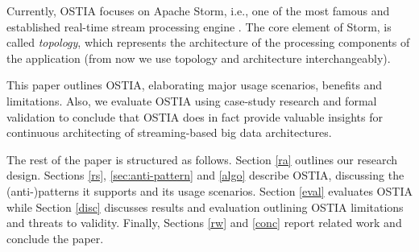 Currently, OSTIA focuses on Apache Storm, i.e., one of the most famous and established real-time stream processing engine \cite{storm, toshniwal2014storm}. The core element of Storm, is called \emph{topology}, which represents the architecture of the processing components of the application (from now we use topology and architecture interchangeably).

This paper outlines OSTIA, elaborating major usage scenarios, benefits and limitations. Also, we evaluate OSTIA using case-study research and formal validation to conclude that OSTIA does in fact provide valuable insights for continuous architecting of streaming-based big data architectures.

The rest of the paper is structured as follows. Section \ref{ra} outlines our research design. Sections \ref{rs}, \ref{sec:anti-pattern} and \ref{algo} describe OSTIA, discussing the (anti-)patterns it supports and its usage scenarios. Section \ref{eval} evaluates OSTIA while Section \ref{disc} discusses results and evaluation outlining OSTIA limitations and threats to validity. Finally, Sections \ref{rw} and \ref{conc} report related work and conclude the paper.
